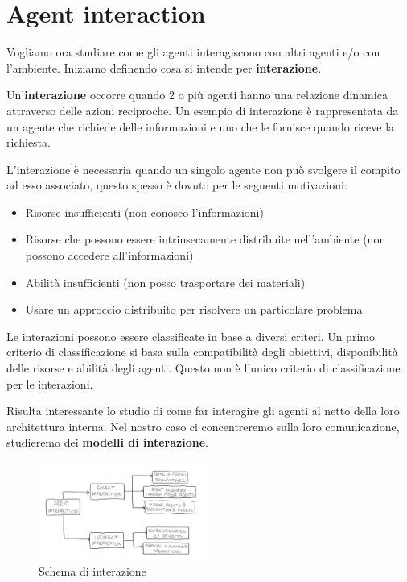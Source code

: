 \section{Agent interaction}
Vogliamo ora studiare come gli agenti interagiscono con altri agenti e/o con
l'ambiente. Iniziamo definendo cosa si intende per \textbf{interazione}.
\begin{definizione}
    Un'\textbf{interazione} occorre quando 2 o più agenti hanno una relazione dinamica
    attraverso delle azioni reciproche. Un esempio di interazione è rappresentata
    da un agente che richiede delle informazioni e uno che le fornisce quando
    riceve la richiesta.
\end{definizione}
L'interazione è necessaria quando un singolo agente non può svolgere il compito
ad esso associato, questo spesso è dovuto per le seguenti motivazioni:
\begin{itemize}
    \item Risorse insufficienti (non conosco l'informazioni)
    \item Risorse che possono essere intrinsecamente distribuite nell'ambiente
          (non possono accedere all'informazioni)
    \item Abilità insufficienti (non posso trasportare dei materiali)
    \item Usare un approccio distribuito per risolvere un particolare problema
\end{itemize}

Le interazioni possono essere classificate in base a diversi criteri. Un primo
criterio di classificazione si basa sulla compatibilità degli obiettivi,
disponibilità delle risorse e abilità degli agenti. Questo non è l'unico criterio
di classificazione per le interazioni.

Risulta interessante lo studio di come far interagire gli agenti al netto della
loro architettura interna. Nel nostro caso ci concentreremo sulla loro
comunicazione, studieremo dei \textbf{modelli di interazione}.
\begin{figure}[!ht]
    \centering
    \includegraphics[width=0.5\textwidth]{./img/Agenti/SchemaDiInterazione.PNG}
    \caption{Schema di interazione}
    \label{fig:Schema_di_interazione}
\end{figure}
